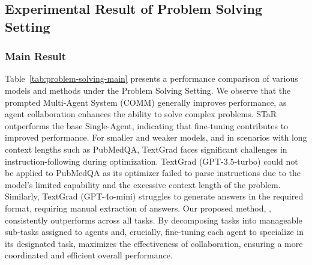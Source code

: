 \subsection{Experimental Result of Problem Solving Setting }
\subsubsection{Main Result} 
Table~\ref{tab:problem-solving-main} presents a performance comparison of various models and methods under the Problem Solving Setting. We observe that the prompted Multi-Agent System (COMM) generally improves performance, as agent collaboration enhances the ability to solve complex problems. STaR outperforms the base Single-Agent, indicating that fine-tuning contributes to improved performance. For smaller and weaker models, and in scenarios with long context lengths such as PubMedQA, TextGrad faces significant challenges in instruction-following during optimization. TextGrad (GPT-3.5-turbo) could not be applied to PubMedQA as its optimizer failed to parse instructions due to the model's limited capability and the excessive context length of the problem. Similarly, TextGrad (GPT-4o-mini) struggles to generate answers in the required format, requiring manual extraction of answers. Our proposed method, \model, consistently outperforms across all tasks. By decomposing tasks into manageable sub-tasks assigned to agents and, crucially, fine-tuning each agent to specialize in its designated task, \model{} maximizes the effectiveness of collaboration, ensuring a more coordinated and efficient overall performance.


